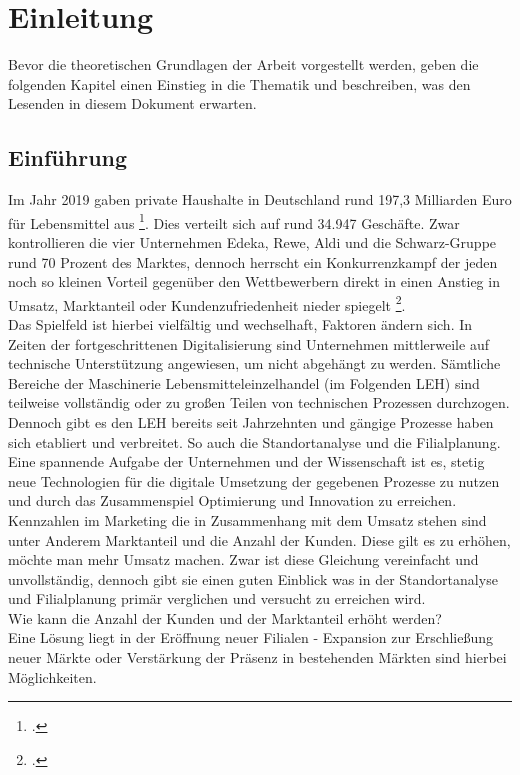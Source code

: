 \chapter{Einleitung}
Bevor die theoretischen Grundlagen der Arbeit vorgestellt werden, geben die folgenden Kapitel einen Einstieg in die Thematik und beschreiben, was den Lesenden in diesem Dokument erwarten.

\section{Einführung}
Im Jahr 2019 gaben private Haushalte in Deutschland rund 197,3 Milliarden Euro für Lebensmittel aus \footcite{statista_konsumausgaben}.
Dies verteilt sich auf rund 34.947 Geschäfte.
Zwar kontrollieren die vier Unternehmen Edeka, Rewe, Aldi und die Schwarz-Gruppe rund 70 Prozent des Marktes, dennoch herrscht ein Konkurrenzkampf der jeden noch so kleinen Vorteil gegenüber den Wettbewerbern direkt in einen Anstieg in Umsatz, Marktanteil oder Kundenzufriedenheit nieder spiegelt \footcite{statista_lebensmittel-discounter}.\\
Das Spielfeld ist hierbei vielfältig und wechselhaft, Faktoren ändern sich. 
In Zeiten der fortgeschrittenen Digitalisierung sind Unternehmen mittlerweile auf technische Unterstützung angewiesen, um nicht abgehängt zu werden. 
Sämtliche Bereiche der Maschinerie Lebensmitteleinzelhandel (im Folgenden LEH) sind teilweise vollständig oder zu großen Teilen von technischen Prozessen durchzogen.
Dennoch gibt es den LEH bereits seit Jahrzehnten und gängige Prozesse haben sich etabliert und verbreitet. 
So auch die Standortanalyse und die Filialplanung. 
Eine spannende Aufgabe der Unternehmen und der Wissenschaft ist es, stetig neue Technologien für die digitale Umsetzung der gegebenen Prozesse zu nutzen und durch das Zusammenspiel Optimierung und Innovation zu erreichen. \\
Kennzahlen im Marketing die in Zusammenhang mit dem Umsatz stehen sind unter Anderem Marktanteil und die Anzahl der Kunden.
Diese gilt es zu erhöhen, möchte man mehr Umsatz machen.
Zwar ist diese Gleichung vereinfacht und unvollständig, dennoch gibt sie einen guten Einblick was in der Standortanalyse und Filialplanung primär verglichen und  versucht zu erreichen wird.\\
Wie kann die Anzahl der Kunden und der Marktanteil erhöht werden?\\
Eine Lösung liegt in der Eröffnung neuer Filialen - Expansion zur Erschließung neuer Märkte oder Verstärkung der Präsenz in bestehenden Märkten sind hierbei Möglichkeiten.
